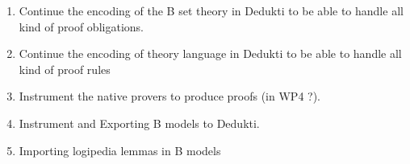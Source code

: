 





\begin{enumerate}

  \item Continue the encoding of the B set theory in Dedukti to be
  able to handle all kind of proof obligations.
  
  \item Continue the encoding of theory language in Dedukti to be 
  able to handle all kind of proof rules

  \item Instrument the native provers to produce proofs (in WP4 ?).

  \item Instrument and Exporting B models to Dedukti.
  
  \item Importing logipedia lemmas in B models
  
\end{enumerate}



